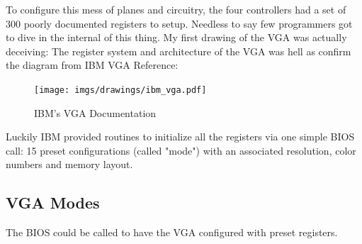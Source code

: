 \documentclass[book.tex]{subfiles}
\begin{document}
 

 

\par
To configure this mess of planes and circuitry, the four controllers had a set of 300 poorly documented registers to setup. Needless to say few programmers got to dive in the internal of this thing. My first drawing of the VGA was actually deceiving: The register system and architecture of the VGA was hell as confirm the diagram from IBM VGA Reference:\\
 \begin{figure}[H]
\centering
\texttt{[image: imgs/drawings/ibm\_vga.pdf]}
\caption{IBM's VGA Documentation}
\label{fig:ibm_vga}
\end{figure}

\bigskip



Luckily IBM provided routines to initialize all the registers via one simple BIOS call: 15 preset configurations (called "mode") with an associated resolution, color numbers and memory layout.

\subsection{VGA Modes}

The BIOS could be called to have the VGA configured with preset registers.
\end{document}
